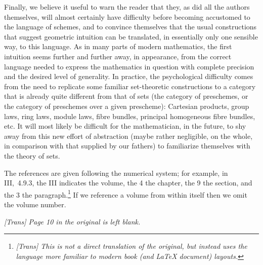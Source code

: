 \sectionbreak

Finally, we believe it useful to warn the reader that they, as did all the authors themselves, will almost certainly have difficulty before becoming accustomed to the language of schemes, and to convince themselves that the usual constructions that suggest geometric intuition can be translated, in essentially only one sensible way, to this language.
As in many parts of modern mathematics, the first intuition seems further and further away, in appearance, from the correct language needed to express the mathematics in question with complete precision and the desired level of generality.
In practice, the psychological difficulty comes from the need to replicate some familiar set-theoretic constructions to a category that is already quite different from that of sets (the category of preschemes, or the category of preschemes over a given prescheme): Cartesian products, group laws, ring laws, module laws, fibre bundles, principal homogeneous fibre bundles, etc.
It will most likely be difficult for the mathematician, in the future, to shy away from this new effort of abstraction (maybe rather negligible, on the whole, in comparison with that supplied by our fathers) to familiarize themselves with the theory of sets.

\sectionbreak

The references are given following the numerical system; for example, in III,~4.9.3, the III indicates the volume, the 4 the chapter, the 9 the section, and the 3 the paragraph.\footnote{\emph{[Trans] This is not a direct translation of the original, but instead uses the language more familiar to modern book (and LaTeX document) layouts.}}
If we reference a volume from within itself then we omit the volume number.

\bigskip

\emph{[Trans] Page 10 in the original is left blank.}






